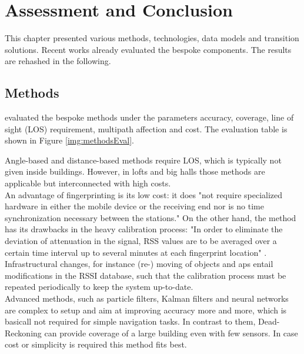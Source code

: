 \section{Assessment and Conclusion}

This chapter presented various methods, technologies, data models and transition solutions. Recent works  already evaluated the bespoke components. The results are rehashed in the following.


\subsection*{Methods}

\cite{recentAdvances} evaluated the bespoke methods under the parameters accuracy, coverage, line of sight (LOS) requirement, multipath affection and cost. The evaluation table is shown in Figure \ref{img:methodsEval}.


Angle-based and distance-based methods require LOS, which is typically not given inside buildings. However, in lofts and big halls those methods are applicable but interconnected with high costs.\\
An advantage of fingerprinting is its low cost: it does "not require specialized hardware in either the mobile device or the receiving end nor is no time synchronization necessary between the stations." \cite{recentAdvances} On the other hand, the method has its drawbacks in the heavy calibration process: "In order to eliminate the deviation of attenuation in the signal, RSS values are to be averaged over a certain time interval up to several minutes at each fingerprint location" \cite{recentAdvances}. Infrastructural changes, for instance (re-) moving of objects and \ac{ap}s entail modifications in the RSSI database, such that the calibration process must be repeated periodically to keep the system up-to-date.\\
Advanced methods, such as particle filters, Kalman filters and neural networks are complex to setup and aim at improving accuracy more and more, which is basicall not required for simple navigation tasks.
In contrast to them, Dead-Reckoning can provide coverage of a large building even with few sensors. In case cost or simplicity is required this method fits best.

